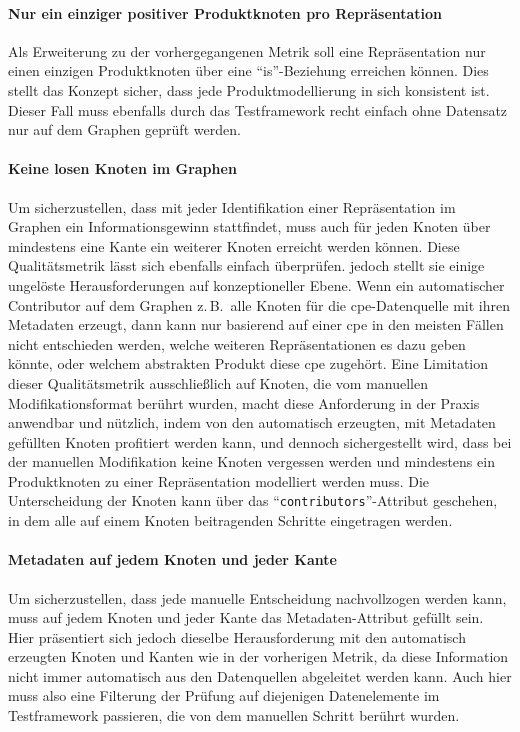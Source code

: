 \paragraph{Nur ein einziger positiver Produktknoten pro Repräsentation}
Als Erweiterung zu der vorhergegangenen Metrik soll eine Repräsentation nur einen einzigen Produktknoten über eine \enquote{is}-Beziehung erreichen können.
Dies stellt das Konzept sicher, dass jede Produktmodellierung in sich konsistent ist.
Dieser Fall muss ebenfalls durch das Testframework recht einfach ohne Datensatz nur auf dem Graphen geprüft werden.

\paragraph{Keine losen Knoten im Graphen}
Um sicherzustellen, dass mit jeder Identifikation einer Repräsentation im Graphen ein Informationsgewinn stattfindet, muss auch für jeden Knoten über mindestens eine Kante ein weiterer Knoten erreicht werden können.
Diese Qualitätsmetrik lässt sich ebenfalls einfach überprüfen.
jedoch stellt sie einige ungelöste Herausforderungen auf konzeptioneller Ebene.
Wenn ein automatischer Contributor auf dem Graphen z.\,B.\ alle Knoten für die \acrshort{cpe}-Datenquelle mit ihren Metadaten erzeugt, dann kann nur basierend auf einer \acrshort{cpe} in den meisten Fällen nicht entschieden werden, welche weiteren Repräsentationen es dazu geben könnte, oder welchem abstrakten Produkt diese \acrshort{cpe} zugehört.
Eine Limitation dieser Qualitätsmetrik ausschließlich auf Knoten, die vom manuellen Modifikationsformat berührt wurden, macht diese Anforderung in der Praxis anwendbar und nützlich, indem von den automatisch erzeugten, mit Metadaten gefüllten Knoten profitiert werden kann, und dennoch sichergestellt wird, dass bei der manuellen Modifikation keine Knoten vergessen werden und mindestens ein Produktknoten zu einer Repräsentation modelliert werden muss.
Die Unterscheidung der Knoten kann über das \enquote{\texttt{contributors}}-Attribut geschehen, in dem alle auf einem Knoten beitragenden Schritte eingetragen werden.

\paragraph{Metadaten auf jedem Knoten und jeder Kante}
Um sicherzustellen, dass jede manuelle Entscheidung nachvollzogen werden kann, muss auf jedem Knoten und jeder Kante das Metadaten-Attribut gefüllt sein.
Hier präsentiert sich jedoch dieselbe Herausforderung mit den automatisch erzeugten Knoten und Kanten wie in der vorherigen Metrik, da diese Information nicht immer automatisch aus den Datenquellen abgeleitet werden kann.
Auch hier muss also eine Filterung der Prüfung auf diejenigen Datenelemente im Testframework passieren, die von dem manuellen Schritt berührt wurden.

